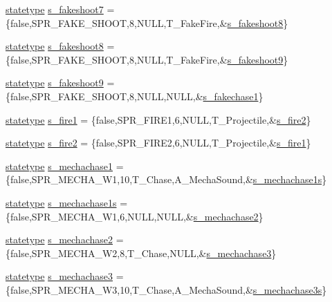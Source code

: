 \begin{DoxyCompactItemize}
\item 
\hyperlink{structstatestruct}{statetype} \hyperlink{WL__ACT2_8C_a7a10174c868f49b0c325e88f823b82e7}{s\_\-fakeshoot7} = \{false,SPR\_\-FAKE\_\-SHOOT,8,NULL,T\_\-FakeFire,\&\hyperlink{WL__ACT2_8C_a3a7d13b4222a3a03167499edde47b16d}{s\_\-fakeshoot8}\}
\item 
\hyperlink{structstatestruct}{statetype} \hyperlink{WL__ACT2_8C_a3a7d13b4222a3a03167499edde47b16d}{s\_\-fakeshoot8} = \{false,SPR\_\-FAKE\_\-SHOOT,8,NULL,T\_\-FakeFire,\&\hyperlink{WL__ACT2_8C_ab57feb5d0874f2fb4e5dc691a3573880}{s\_\-fakeshoot9}\}
\item 
\hyperlink{structstatestruct}{statetype} \hyperlink{WL__ACT2_8C_ab57feb5d0874f2fb4e5dc691a3573880}{s\_\-fakeshoot9} = \{false,SPR\_\-FAKE\_\-SHOOT,8,NULL,NULL,\&\hyperlink{WL__DEF_8H_ad76ee345c327e96e3564960e280e5889}{s\_\-fakechase1}\}
\item 
\hyperlink{structstatestruct}{statetype} \hyperlink{WL__ACT2_8C_a3247cee4b08b528908e9762b1f92b3dd}{s\_\-fire1} = \{false,SPR\_\-FIRE1,6,NULL,T\_\-Projectile,\&\hyperlink{WL__ACT2_8C_a216d8ef5aaac32a48b60e5b348b84678}{s\_\-fire2}\}
\item 
\hyperlink{structstatestruct}{statetype} \hyperlink{WL__ACT2_8C_a216d8ef5aaac32a48b60e5b348b84678}{s\_\-fire2} = \{false,SPR\_\-FIRE2,6,NULL,T\_\-Projectile,\&\hyperlink{WL__ACT2_8C_a3247cee4b08b528908e9762b1f92b3dd}{s\_\-fire1}\}
\item 
\hyperlink{structstatestruct}{statetype} \hyperlink{WL__ACT2_8C_a7fd4292362075e6baaf13d0148e5c631}{s\_\-mechachase1} = \{false,SPR\_\-MECHA\_\-W1,10,T\_\-Chase,A\_\-MechaSound,\&\hyperlink{WL__ACT2_8C_ac901c64e074ea0ed955fb159bb0ddf35}{s\_\-mechachase1s}\}
\item 
\hyperlink{structstatestruct}{statetype} \hyperlink{WL__ACT2_8C_ac901c64e074ea0ed955fb159bb0ddf35}{s\_\-mechachase1s} = \{false,SPR\_\-MECHA\_\-W1,6,NULL,NULL,\&\hyperlink{WL__ACT2_8C_a7757d348088221c1f7a0ec5154692bc5}{s\_\-mechachase2}\}
\item 
\hyperlink{structstatestruct}{statetype} \hyperlink{WL__ACT2_8C_a7757d348088221c1f7a0ec5154692bc5}{s\_\-mechachase2} = \{false,SPR\_\-MECHA\_\-W2,8,T\_\-Chase,NULL,\&\hyperlink{WL__ACT2_8C_af0b2e2eac1f309adf61b13dbfdd96fb0}{s\_\-mechachase3}\}
\item 
\hyperlink{structstatestruct}{statetype} \hyperlink{WL__ACT2_8C_af0b2e2eac1f309adf61b13dbfdd96fb0}{s\_\-mechachase3} = \{false,SPR\_\-MECHA\_\-W3,10,T\_\-Chase,A\_\-MechaSound,\&\hyperlink{WL__ACT2_8C_aaf123e2cfe781d241e08844abca78b78}{s\_\-mechachase3s}\}

\end{DoxyCompactItemize}
